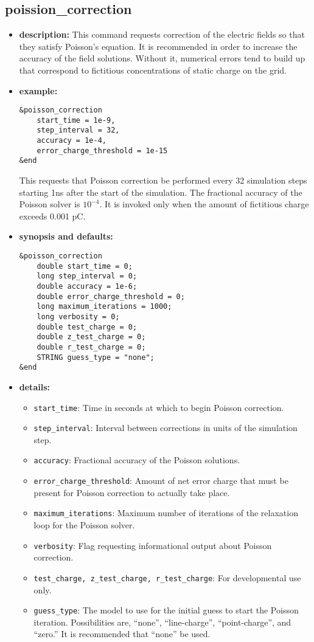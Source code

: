 %
\newpage

\subsection{poission\_correction}

\begin{itemize}

\item {\bf description:}
This command requests correction of the electric fields so that they
satisfy Poisson's equation.  It is recommended in order to increase
the accuracy of the field solutions.  Without it, numerical errors
tend to build up that correspond to fictitious concentrations of
static charge on the grid.

\item {\bf example:} 
\begin{verbatim}
&poisson_correction
    start_time = 1e-9, 
    step_interval = 32,
    accuracy = 1e-4,
    error_charge_threshold = 1e-15
&end
\end{verbatim}
This requests that Poisson correction be performed every 32 simulation
steps starting 1ns after the start of the simulation.  The fractional
accuracy of the Poisson solver is $10^{-4}$.  It is invoked only when
the amount of fictitious charge exceeds 0.001 pC.

\item {\bf synopsis and defaults:} 
\begin{verbatim}
&poisson_correction
    double start_time = 0;
    long step_interval = 0;
    double accuracy = 1e-6;
    double error_charge_threshold = 0;
    long maximum_iterations = 1000;
    long verbosity = 0;
    double test_charge = 0;
    double z_test_charge = 0;
    double r_test_charge = 0;
    STRING guess_type = "none";
&end
\end{verbatim}

\item {\bf details:} 
\begin{itemize}
\item {\tt start\_time}: Time in seconds at which to begin Poisson correction.
\item {\tt step\_interval}: Interval between corrections in units of the simulation step.
\item {\tt accuracy}: Fractional accuracy of the Poisson solutions.
\item {\tt error\_charge\_threshold}: Amount of net error charge that must be present for
        Poisson correction to actually take place.
\item {\tt maximum\_iterations}: Maximum number of iterations of the relaxation loop for
        the Poisson solver.
\item {\tt verbosity}: Flag requesting informational output about Poisson correction.
\item {\tt test\_charge, z\_test\_charge, r\_test\_charge}:  For developmental use only.
\item {\tt guess\_type}: The model to use for the initial guess to start the Poisson
        iteration.  Possibilities are, ``none'', ``line-charge'', ``point-charge'', and
        ``zero.''  It is recommended that ``none'' be used.
\end{itemize}

\end{itemize}
